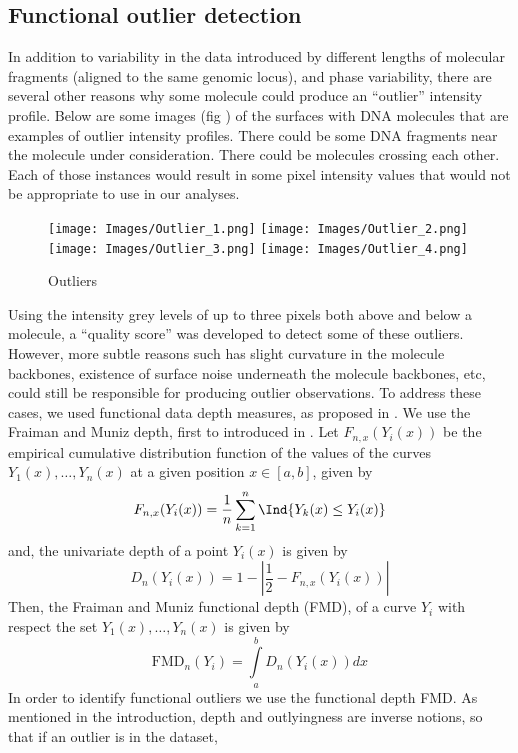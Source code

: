 \subsection{Functional outlier detection}
In addition to variability in the data introduced by different lengths of molecular fragments (aligned to the same genomic locus), and phase variability, there are several other reasons why some molecule could produce an ``outlier'' intensity profile. Below are some images (fig \cite{fig:Fig3_OutlierImages}) of the surfaces with DNA molecules that are examples of outlier intensity profiles. There could be some DNA fragments near the molecule under consideration. There could be molecules crossing each other. Each of those instances would result in some pixel intensity values that would not be appropriate to use in our analyses. 
\begin{figure}[H]
\begin{center}
\texttt{[image: Images/Outlier\_1.png]}
\texttt{[image: Images/Outlier\_2.png]}
\texttt{[image: Images/Outlier\_3.png]}
\texttt{[image: Images/Outlier\_4.png]}
\end{center}
\caption{Outliers}
\label{fig:Fig3_OutlierImages}
\end{figure}
Using the intensity grey levels of up to three pixels both above and below a molecule, a ``quality score'' was developed to detect some of these outliers. However, more subtle reasons such has slight curvature in the molecule backbones, existence of surface noise underneath the molecule backbones, etc, could still be responsible for producing outlier observations. To address these cases, we used functional data depth measures, as proposed in \cite{Febrero-Bande_etal_2007_Environmetrics}. We use the Fraiman and Muniz depth, first to introduced in \cite{Fraiman_Muniz_2001_SEIO}. Let $F_{n,x} (Y_i (x))$ be the empirical cumulative distribution function of the values of the curves $Y_1(x), \dots , Y_n(x)$ at a given position $x \in [a, b]$, given by
\[ F_{n,x} (Y_i (x)) = \frac{1}{n}\sum\limits_{k=1}^{n} \Ind\{ Y_k(x) \leq Y_i(x)\}\]
and, the univariate depth of a point $Y_i(x)$ is given by
\[ D_n(Y_i(x)) = 1 - \left| \frac{1}{2} - F_{n,x} (Y_i (x)) \right| \]
Then, the Fraiman and Muniz functional depth (FMD), of a curve $Y_i$ with respect the set $Y_1(x), \dots , Y_n(x)$ is given by 
\begin{equation}
\text{FMD}_n(Y_i) = \int\limits_a^b D_n(Y_i(x)) dx
\label{eq:3_depth}
\end{equation}
In order to identify functional outliers we use the functional depth FMD. As mentioned in the introduction, depth and outlyingness are inverse notions, so that if an outlier is in the dataset, 
